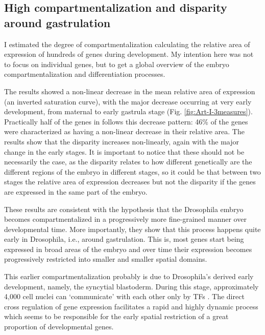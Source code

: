 \subsection{High compartmentalization and disparity around gastrulation}
I estimated the degree of compartmentalization calculating the relative area of expression of hundreds of genes during development.
My intention here was not to focus on individual genes, but to get a global overview of the embryo compartmentalization and differentiation processes.

The results showed a non-linear decrease in the mean relative area of expression (an inverted saturation curve), with the major decrease occurring at very early development, from maternal to early gastrula stage (Fig. \ref{fig:Art-I-3measures}).
Practically half of the genes in follows this decrease pattern: 46\% of the genes were characterized as having a non-linear decrease in their relative area.
The results show that the disparity increases non-linearly, again with the major change in the early stages.
%
It is important to notice that these should not be necessarily the case, as the disparity relates to how different genetically are the different regions of the embryo in different stages, so it could be that between two stages the relative area of expression decreases but not the disparity if the genes are expressed in the same part of the embryo.


These results are consistent with the hypothesis that the Drosophila embryo becomes compartmentalized in a progressively more fine-grained manner over developmental time. 
More importantly, they show that this process happens quite early in Drosophila, i.e., around gastrulation.
This is, most genes start being expressed in broad areas of the embryo and over time their expression becomes progressively restricted into smaller and smaller spatial domains.

This earlier compartmentalization probably is due to Drosophila's derived early development, namely, the syncytial blastoderm. During this stage, approximately 4,000 cell nuclei can `communicate' with each other only by TFs \citep{Jaeger2011}. The direct cross regulation of gene expression facilitates a rapid and highly dynamic process which seems to be responsible for the early spatial restriction of a great proportion of developmental genes.

